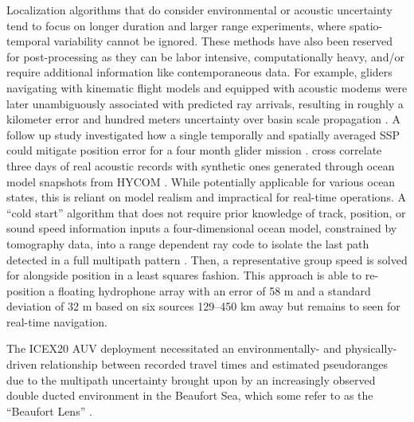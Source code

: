 Localization algorithms that do consider environmental or acoustic uncertainty tend to focus on longer duration and larger range experiments, where spatio-temporal variability cannot be ignored.
These methods have also been reserved for post-processing as they can be labor intensive, computationally heavy, and/or require additional information like contemporaneous data.
For example, gliders navigating with kinematic flight models and equipped with acoustic modems were later unambiguously associated with predicted ray arrivals, resulting in roughly a kilometer error and hundred meters uncertainty over basin scale propagation \cite{VanUffelen2013}.
A follow up study investigated how a single temporally and spatially averaged SSP could mitigate position error for a four month glider mission \cite{vanuffelen2016localization}.
\citet{Wu2019} cross correlate three days of real acoustic records with synthetic ones generated through ocean model snapshots from HYCOM \cite{chassignet_hycom_2007}.
While potentially applicable for various ocean states, this is reliant on model realism and impractical for real-time operations.
A ``cold start'' algorithm that does not require prior knowledge of track, position, or sound speed information inputs a four-dimensional ocean model, constrained by tomography data, into a range dependent ray code to isolate the last path detected in a full multipath pattern \citep{Mikhalevsky2020}.
Then, a representative group speed is solved for alongside position in a least squares fashion. 
This approach is able to re-position a floating hydrophone array with an error of 58 m and a standard deviation of 32 m based on six sources 129--450 km away but remains to seen for real-time navigation.

The ICEX20 AUV deployment necessitated an environmentally- and physically-driven relationship between recorded travel times and estimated pseudoranges due to the multipath uncertainty brought upon by an increasingly observed double ducted environment in the Beaufort Sea, which some refer to as the ``Beaufort Lens'' \citep{litvak2015,chen_spectral_2019,chen_temporal_2020}.

